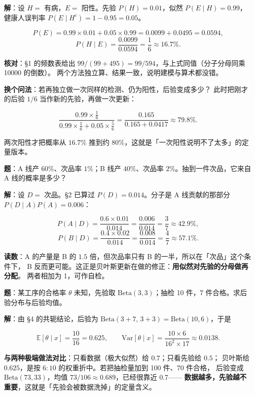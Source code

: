 \documentclass[11pt]{ctexart}
\begin{document}
\textbf{解}：设 $H=$ 有病，$E=$ 阳性。先验 $P(H)=0.01$，似然 $P(E\mid H)=0.99$，
健康人误判率 $P(E\mid H^{c})=1-0.95=0.05$。

\[
P(E)=0.99\times0.01+0.05\times0.99=0.0099+0.0495=0.0594,
\]
\[
P(H\mid E)=\frac{0.0099}{0.0594}=\frac{1}{6}\approx 16.7\% .
\]

\textbf{核对}：§1 的频数表给出 $99/(99+495)=99/594$，与上式同值（分子分母同乘 10000 的倒数）。
两个方法独立算、结果一致，说明建模与算术都没错。

\textbf{换个问法}：若再独立做一次同样的检测、仍为阳性，后验变成多少？
此时把刚才的后验 $1/6$ 当作新的先验，再做一次更新：

\[
\frac{0.99\times\frac{1}{6}}{0.99\times\frac{1}{6}+0.05\times\frac{5}{6}}
=\frac{0.165}{0.165+0.0417}\approx 79.8\% .
\]

两次阳性才把概率从 $16.7\%$ 推到约 $80\%$，这就是「一次阳性说明不了太多」的定量版本。


\textbf{题}：A 线产 $60\%$、次品率 $1\%$；B 线产 $40\%$、次品率 $2\%$。抽到一件次品，它来自 A 线的概率是多少？

\textbf{解}：设 $D=$ 次品。§2 已算过 $P(D)=0.014$。分子是 A 线贡献的那部分 $P(D\mid A)P(A)=0.006$：

\[
P(A\mid D)=\frac{0.6\times0.01}{0.014}=\frac{0.006}{0.014}=\frac{3}{7}\approx 42.9\% ,
\]
\[
P(B\mid D)=\frac{0.4\times0.02}{0.014}=\frac{0.008}{0.014}=\frac{4}{7}\approx 57.1\% .
\]

\textbf{读数}：A 的产量是 B 的 $1.5$ 倍，但次品率只有 B 的一半，所以在「次品」这个条件下，
B 反而更可能。这正是贝叶斯更新在做的修正：\textbf{用似然对先验的分母做再分配}。
两者相加为 1，可作自检。


\textbf{题}：某工序的合格率 $\theta$ 未知，先验取 $\mathrm{Beta}(3,3)$；抽检 10 件，7 件合格。求后验分布与后验均值。

\textbf{解}：由 §4 的共轭结论，后验为 $\mathrm{Beta}(3+7,\,3+3)=\mathrm{Beta}(10,6)$，于是

\[
\mathbb{E}[\theta\mid x]=\frac{10}{16}=0.625,\qquad
\mathrm{Var}[\theta\mid x]=\frac{10\times 6}{16^{2}\times 17}\approx 0.0138 .
\]

\textbf{与两种极端做法对比}：只看数据（极大似然）给 $0.7$；只看先验给 $0.5$；
贝叶斯给 $0.625$，是按 $6:10$ 的权重折中。若把抽检量加到 100 件、70 件合格，
后验变成 $\mathrm{Beta}(73,33)$，均值 $73/106\approx 0.689$，已经很靠近 $0.7$——
\textbf{数据越多，先验越不重要}，这就是「先验会被数据洗掉」的定量含义。
\end{document}
